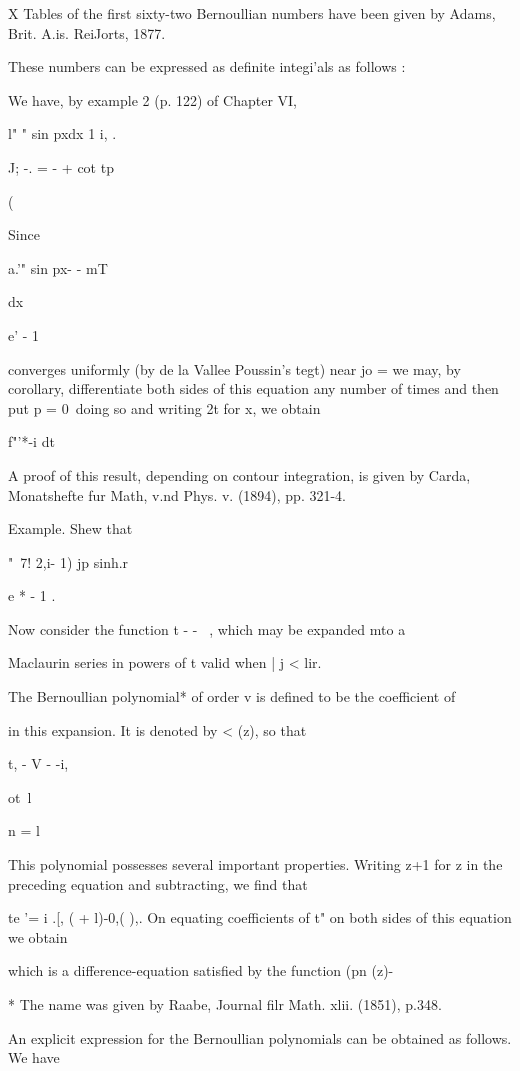 X Tables of the first sixty-two Bernoullian numbers have been given by
Adams, Brit. A.is. ReiJorts, 1877.

%
%
These numbers can be expressed as definite integi'als as follows :

We have, by example 2 (p. 122) of Chapter VI,

l" " sin pxdx 1 i, .

J; -. = - + cot tp

(

Since

a.'" sin px- - mT\

dx

e' - 1

converges uniformly (by de la Vallee Poussin's tegt) near jo = we may,
by  corollary, differentiate both sides of this equation any
number of times and then put p = 0\ doing so and writing 2t for x, we
obtain

f"'*-i dt

A proof of this result, depending on contour integration, is given by
Carda, Monatshefte fur Math, v.nd Phys. v. (1894), pp. 321-4.

Example. Shew that

"~7! 2,i- 1) jp sinh.r

e * - 1 .

Now consider the function t - - ~, which may be expanded mto a

Maclaurin series in powers of t valid when | j < lir.

The Bernoullian polynomial* of order v is defined to be the
coefficient of

in this expansion. It is denoted by < (z), so that

t, - V - -i,

ot\ l

n = l

This polynomial possesses several important properties. Writing z+1
for z in the preceding equation and subtracting, we find that

te '= i .[, ( + l)-0,( ),. On equating coefficients of t" on both
sides of this equation we obtain

which is a difference-equation satisfied by the function (pn (z)-

* The name was given by Raabe, Journal filr Math. xlii. (1851), p.348.

%
%

An explicit expression for the Bernoullian polynomials can be obtained
as follows. We have


